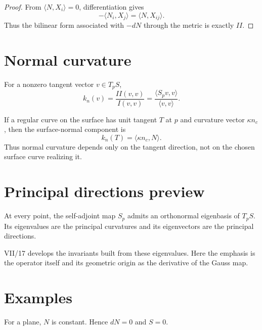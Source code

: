 \begin{proof}
From \(\langle N,X_i\rangle=0\), differentiation gives
\[
-\langle N_i,X_j\rangle=\langle N,X_{ij}\rangle.
\]
Thus the bilinear form associated with \(-dN\) through the metric is exactly \(II\).
\end{proof}

\section{Normal curvature}

\begin{definition}\label{def:vii16-normal-curvature}
For a nonzero tangent vector \(v\in T_pS\),
\[
k_n(v)=\frac{II(v,v)}{I(v,v)}
      =\frac{\langle S_pv,v\rangle}{\langle v,v\rangle}.
\]
\end{definition}

\begin{theorem}\label{thm:vii16-meusnier}
If a regular curve on the surface has unit tangent \(T\) at \(p\) and curvature vector \(\kappa n_c\), then the surface-normal component is
\[
k_n(T)=\langle \kappa n_c,N\rangle.
\]
Thus normal curvature depends only on the tangent direction, not on the chosen surface curve realizing it.
\end{theorem}

\section{Principal directions preview}

\begin{theorem}\label{thm:vii16-spectral}
At every point, the self-adjoint map \(S_p\) admits an orthonormal eigenbasis of \(T_pS\). Its eigenvalues are the principal curvatures and its eigenvectors are the principal directions.
\end{theorem}

\begin{remark}
VII/17 develops the invariants built from these eigenvalues. Here the emphasis is the operator itself and its geometric origin as the derivative of the Gauss map.
\end{remark}

\section{Examples}

\begin{example}[Plane]\label{ex:vii16-plane}
For a plane, \(N\) is constant. Hence \(dN=0\) and \(S=0\).
\end{example}

